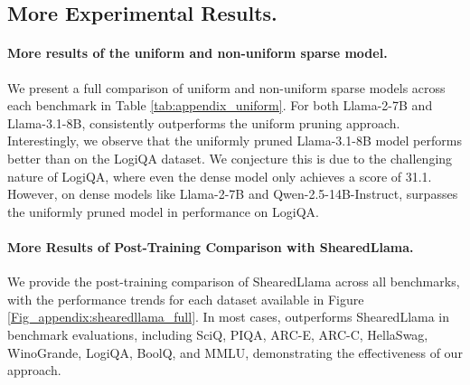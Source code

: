 
\subsection{More Experimental Results.}
\paragraph{More results of the uniform and non-uniform sparse model.} We present a full comparison of uniform and non-uniform sparse models across each benchmark in Table \ref{tab:appendix_uniform}. For both Llama-2-7B and Llama-3.1-8B, \sysname consistently outperforms the uniform pruning approach. Interestingly, we observe that the uniformly pruned Llama-3.1-8B model performs better than \sysname on the LogiQA dataset. We conjecture this is due to the challenging nature of LogiQA, where even the dense model only achieves a score of 31.1. However, on dense models like Llama-2-7B and Qwen-2.5-14B-Instruct, \sysname surpasses the uniformly pruned model in performance on LogiQA.


\paragraph{More Results of Post-Training Comparison with ShearedLlama.} We provide the post-training comparison of ShearedLlama across all benchmarks, with the performance trends for each dataset available in Figure \ref{Fig_appendix:shearedllama_full}. In most cases, \sysname outperforms ShearedLlama in benchmark evaluations, including SciQ, PIQA, ARC-E, ARC-C, HellaSwag, WinoGrande, LogiQA, BoolQ, and MMLU, demonstrating the effectiveness of our approach.
